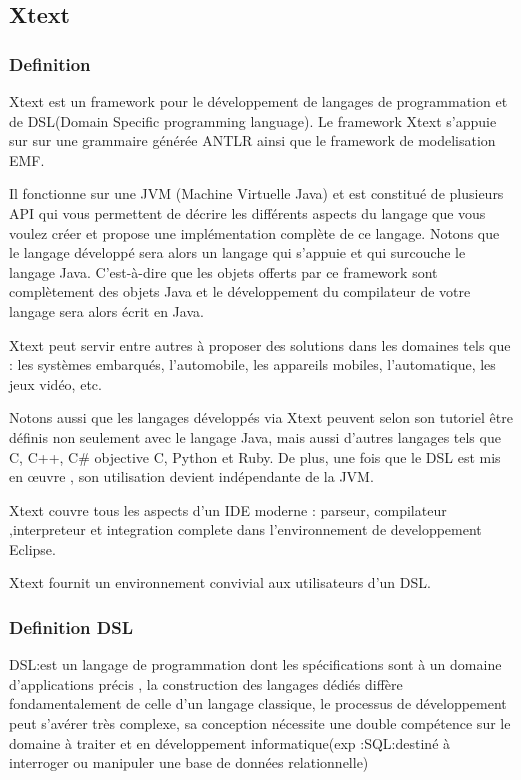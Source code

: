 \documentclass{article}
\begin{document}
{\subsection{Xtext}
\subsubsection{Definition}
Xtext est un framework pour le développement de langages de programmation et de DSL(Domain Specific programming language).
Le framework Xtext s’appuie sur sur une grammaire générée ANTLR ainsi que le framework de modelisation EMF.

Il fonctionne sur une JVM (Machine Virtuelle Java) et est constitué de plusieurs API qui vous permettent de décrire les différents aspects du langage que vous voulez créer et propose une implémentation complète de ce langage. Notons que le langage développé sera alors un langage qui s'appuie et qui surcouche le langage Java. C'est-à-dire que les objets offerts par ce framework sont complètement des objets Java et le développement du compilateur de votre langage sera alors écrit en Java.

Xtext peut servir entre autres à proposer des solutions dans les domaines tels que : les systèmes embarqués, l'automobile, les appareils mobiles, l'automatique, les jeux vidéo, etc.

Notons aussi que les langages développés via Xtext peuvent selon son tutoriel être définis non seulement avec le langage Java, mais aussi d'autres langages tels que C, C++, C# objective C, Python et Ruby. De plus, une fois que le DSL est mis en œuvre , son utilisation devient indépendante de la JVM. 

Xtext couvre tous les aspects d’un IDE moderne : parseur, compilateur ,interpreteur et integration complete dans l’environnement de developpement Eclipse.

Xtext fournit un environnement convivial aux utilisateurs d’un DSL.

\subsubsection{Definition DSL}
DSL:est un langage de programmation dont les spécifications sont à un domaine d’applications précis , la construction des langages dédiés diffère fondamentalement de celle d’un langage classique, le processus de développement  peut s'avérer très complexe, sa conception nécessite une double compétence sur le domaine à traiter et en développement informatique(exp :SQL:destiné à interroger ou manipuler une base de données relationnelle)

}
\end{document}

